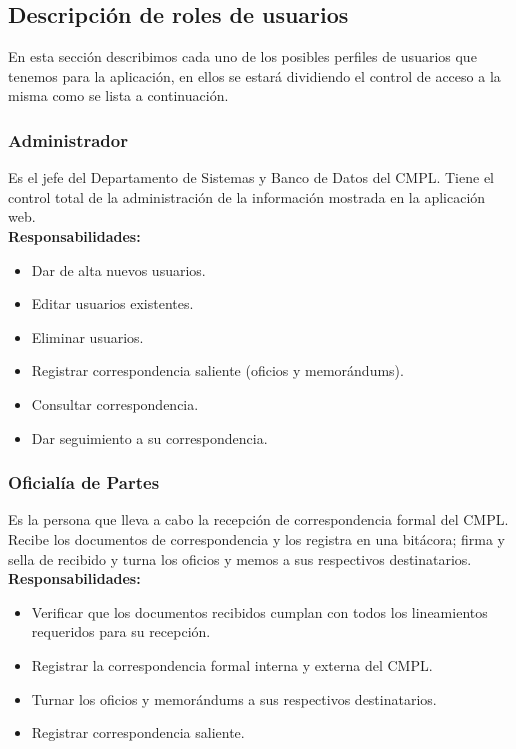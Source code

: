 \subsection{Descripción de roles de usuarios}
En esta sección describimos cada uno de los posibles perfiles de usuarios que tenemos para la aplicación, en ellos se estará dividiendo el control de acceso a la misma como se lista a continuación.\\

\subsubsection{Administrador}
Es el jefe del Departamento de Sistemas y Banco de Datos del CMPL. Tiene el control total de la administración de la información mostrada en la aplicación web.\\

\textbf{Responsabilidades:}
\begin{itemize}
	\item Dar de alta nuevos usuarios.
	\item Editar usuarios existentes.
	\item Eliminar usuarios.
	\item Registrar correspondencia saliente (oficios y memorándums).
	\item Consultar correspondencia.
	\item Dar seguimiento a su correspondencia.
\end{itemize}

\subsubsection{Oficialía de Partes}
Es la persona que lleva a cabo la recepción de correspondencia formal del CMPL. Recibe los documentos de correspondencia y los registra en una bitácora; firma y sella de recibido y turna los oficios y memos a sus respectivos destinatarios.\\

\textbf{Responsabilidades:}
\begin{itemize}
	\item Verificar que los documentos recibidos cumplan con todos los lineamientos requeridos para su recepción.
	\item Registrar la correspondencia formal interna y externa del CMPL.
	\item Turnar los oficios y memorándums a sus respectivos destinatarios.
	\item Registrar correspondencia saliente.
\end{itemize}

